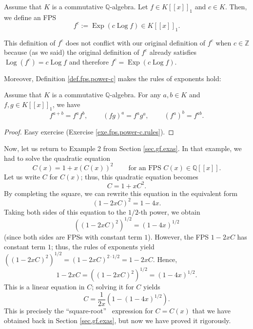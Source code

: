 \begin{definition}
\label{def.fps.power-c}Assume that $K$ is a commutative $\mathbb{Q}$-algebra.
Let $f\in K\left[  \left[  x\right]  \right]  _{1}$ and $c\in K$. Then, we
define an FPS%
\[
f^{c}:=\operatorname*{Exp}\left(  c\operatorname*{Log}f\right)  \in K\left[
\left[  x\right]  \right]  _{1}.
\]

\end{definition}

This definition of $f^{c}$ does not conflict with our original definition of
$f^{c}$ when $c\in\mathbb{Z}$ because (as we said) the original definition of
$f^{c}$ already satisfies $\operatorname*{Log}\left(  f^{c}\right)
=c\operatorname*{Log}f$ and therefore $f^{c}=\operatorname*{Exp}\left(
c\operatorname*{Log}f\right)  $.

Moreover, Definition \ref{def.fps.power-c} makes the rules of exponents hold:

\begin{theorem}
\label{thm.fps.power-c.rules}Assume that $K$ is a commutative $\mathbb{Q}%
$-algebra. For any $a,b\in K$ and $f,g\in K\left[  \left[  x\right]  \right]
_{1}$, we have
\[
f^{a+b}=f^{a}f^{b},\ \ \ \ \ \ \ \ \ \ \left(  fg\right)  ^{a}=f^{a}%
g^{a},\ \ \ \ \ \ \ \ \ \ \left(  f^{a}\right)  ^{b}=f^{ab}.
\]

\end{theorem}

\begin{proof}
Easy exercise (Exercise \ref{exe.fps.power-c.rules}).
\end{proof}

Now, let us return to Example 2 from Section \ref{sec.gf.exas}. In that
example, we had to solve the quadratic equation
\[
C\left(  x\right)  =1+x\left(  C\left(  x\right)  \right)  ^{2}%
\ \ \ \ \ \ \ \ \ \ \text{for an FPS }C\left(  x\right)  \in\mathbb{Q}\left[
\left[  x\right]  \right]  .
\]
Let us write $C$ for $C\left(  x\right)  $; thus, this quadratic equation
becomes%
\[
C=1+xC^{2}.
\]
By completing the square, we can rewrite this equation in the equivalent form%
\[
\left(  1-2xC\right)  ^{2}=1-4x.
\]
Taking both sides of this equation to the $1/2$-th power, we obtain%
\[
\left(  \left(  1-2xC\right)  ^{2}\right)  ^{1/2}=\left(  1-4x\right)  ^{1/2}%
\]
(since both sides are FPSs with constant term $1$). However, the FPS $1-2xC$
has constant term $1$; thus, the rules of exponents yield $\left(  \left(
1-2xC\right)  ^{2}\right)  ^{1/2}=\left(  1-2xC\right)  ^{2\cdot1/2}=1-2xC$.
Hence,%
\[
1-2xC=\left(  \left(  1-2xC\right)  ^{2}\right)  ^{1/2}=\left(  1-4x\right)
^{1/2}.
\]
This is a linear equation in $C$; solving it for $C$ yields%
\[
C=\dfrac{1}{2x}\left(  1-\left(  1-4x\right)  ^{1/2}\right)  .
\]
This is precisely the \textquotedblleft square-root\textquotedblright%
\ expression for $C=C\left(  x\right)  $ that we have obtained back in Section
\ref{sec.gf.exas}, but now we have proved it rigorously.

